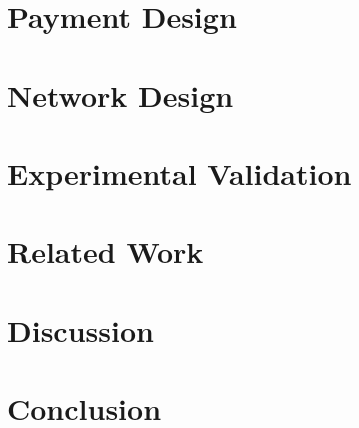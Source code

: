 \documentclass[USenglish,oneside,twocolumn]{article}
\begin{document}
%
%

\section{Payment Design}
\label{sec:payment}


\section{Network Design}
\label{sec:network}


\section{Experimental Validation}
\label{sec:experimentations}


\section{Related Work}
\label{sec:related_work}


%

\section{Discussion}

\label{sec:discussion}

% 

\section{Conclusion}
\label{sec:conclusion}


\end{document}
